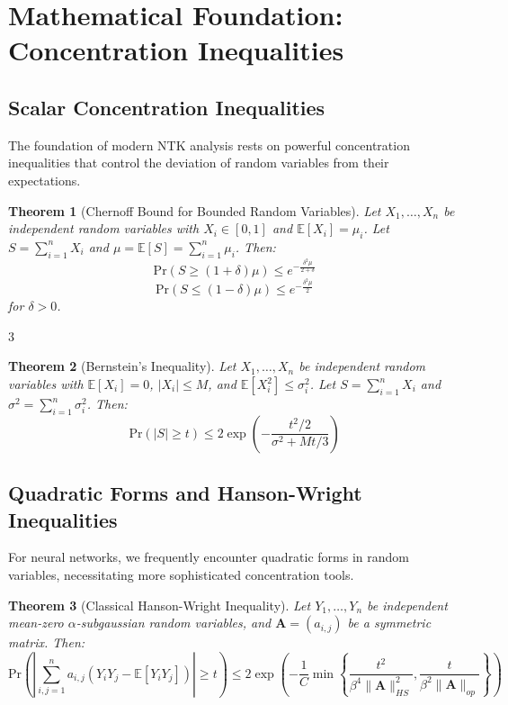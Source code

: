 \documentclass{article}
\newtheorem{theorem}{Theorem}[section]
\newcommand{\E}{\mathbb{E}}
\newcommand{\Pr}{\text{Pr}}
\begin{document}
\newpage

\section{Mathematical Foundation: Concentration Inequalities}

\subsection{Scalar Concentration Inequalities}

The foundation of modern NTK analysis rests on powerful concentration inequalities that control the deviation of random variables from their expectations.

\begin{theorem}[Chernoff Bound for Bounded Random Variables]
Let $X_1, \ldots, X_n$ be independent random variables with $X_i \in [0,1]$ and $\E[X_i] = \mu_i$. Let $S = \sum_{i=1}^n X_i$ and $\mu = \E[S] = \sum_{i=1}^n \mu_i$. Then:
$$\Pr(S \geq (1+\delta)\mu) \leq e^{-\frac{\delta^2 \mu}{2+\delta}}$$
$$\Pr(S \leq (1-\delta)\mu) \leq e^{-\frac{\delta^2 \mu}{2}}$$
for $\delta > 0$.
\end{theorem}

3\begin{theorem}[Bernstein's Inequality]
Let $X_1, \ldots, X_n$ be independent random variables with $\E[X_i] = 0$, $|X_i| \leq M$, and $\E[X_i^2] \leq \sigma_i^2$. Let $S = \sum_{i=1}^n X_i$ and $\sigma^2 = \sum_{i=1}^n \sigma_i^2$. Then:
$$\Pr(|S| \geq t) \leq 2\exp\left(-\frac{t^2/2}{\sigma^2 + Mt/3}\right)$$
\end{theorem}

\subsection{Quadratic Forms and Hanson-Wright Inequalities}

For neural networks, we frequently encounter quadratic forms in random variables, necessitating more sophisticated concentration tools.

\begin{theorem}[Classical Hanson-Wright Inequality]
Let $Y_1, \ldots, Y_n$ be independent mean-zero $\alpha$-subgaussian random variables, and $\mathbf{A} = (a_{i,j})$ be a symmetric matrix. Then:
$$\Pr\left(\left|\sum_{i,j=1}^n a_{i,j}(Y_i Y_j - \E[Y_i Y_j])\right| \geq t\right) \leq 2\exp\left(-\frac{1}{C}\min\left\{\frac{t^2}{\beta^4\|\mathbf{A}\|_{HS}^2}, \frac{t}{\beta^2\|\mathbf{A}\|_{op}}\right\}\right)$$
\end{theorem}
\end{document}
